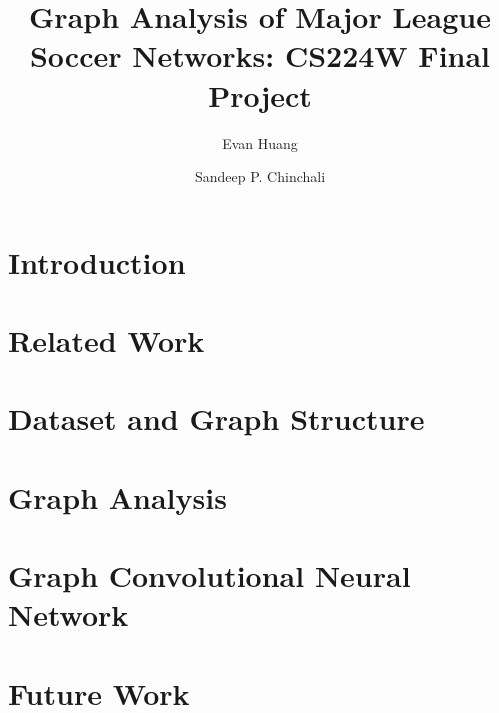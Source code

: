\documentclass[newfonts=false,format=sigconf,10pt,letterpaper]{acmart}
\begin{document}

\title{Graph Analysis of Major League Soccer Networks: CS224W Final Project}

\author{Evan Huang}

\author{Sandeep P. Chinchali}

\maketitle

\section{Introduction}
\label{sec:introduction}


\section{Related Work}
\label{sec:related_work}


\section{Dataset and Graph Structure}
\label{sec:dataset}


\section{Graph Analysis}
\label{sec:graph_analysis}


\section{Graph Convolutional Neural Network}
\label{sec:graph_GCN}


\section{Future Work}
\label{sec:future_work}

\end{document}
